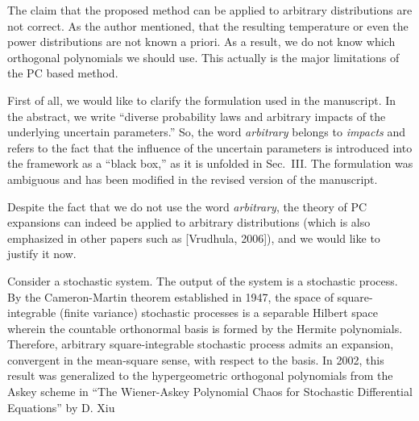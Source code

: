 \begin{reviewer}
The claim that the proposed method can be applied to arbitrary distributions are not correct. As the author mentioned, that the resulting temperature or even the power distributions are not known a priori. As a result, we do not know which orthogonal polynomials we should use. This actually is the major limitations of the PC based method.
\end{reviewer}
\begin{authors}
First of all, we would like to clarify the formulation used in the manuscript.
In the abstract, we write ``diverse probability laws and arbitrary impacts of the underlying uncertain parameters.''
So, the word \emph{arbitrary} belongs to \emph{impacts} and refers to the fact that the influence of the uncertain parameters is introduced into the framework as a ``black box,'' as it is unfolded in Sec.~III.
The formulation was ambiguous and has been modified in the revised version of the manuscript.

Despite the fact that we do not use the word \emph{arbitrary}, the theory of PC expansions can indeed be applied to arbitrary distributions (which is also emphasized in other papers such as [Vrudhula, 2006]), and we would like to justify it now.

Consider a stochastic system.
The output of the system is a stochastic process.
By the Cameron-Martin theorem established in 1947, the space of square-integrable (finite variance) stochastic processes is a separable Hilbert space wherein the countable orthonormal basis is formed by the Hermite polynomials.
Therefore, arbitrary square-integrable stochastic process admits an expansion, convergent in the mean-square sense, with respect to the basis.
In 2002, this result was generalized to the hypergeometric orthogonal polynomials from the Askey scheme in ``The Wiener-Askey Polynomial Chaos for Stochastic Differential Equations'' by D. Xiu \etal


\end{authors}
